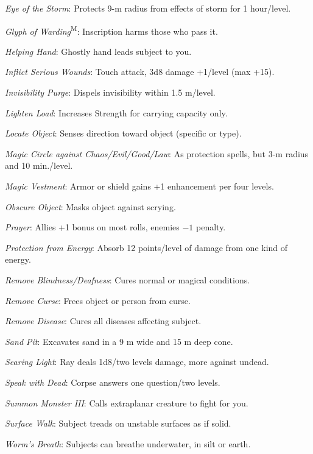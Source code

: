 \textit{Eye of the Storm}: Protects 9-m radius from effects of storm for 1 hour/level.

\textit{Glyph of Warding}\textsuperscript{M}: Inscription harms those who pass it.

\textit{Helping Hand}: Ghostly hand leads subject to you.

\textit{Inflict Serious Wounds}: Touch attack, 3d8 damage +1/level (max +15).

\textit{Invisibility Purge}: Dispels invisibility within 1.5 m/level.

\textit{Lighten Load}: Increases Strength for carrying capacity only.

\textit{Locate Object}: Senses direction toward object (specific or type).

\textit{Magic Circle against Chaos/Evil/Good/Law}: As protection spells, but 3-m radius and 10 min./level.

\textit{Magic Vestment}: Armor or shield gains +1 enhancement per four levels.


\textit{Obscure Object}: Masks object against scrying.

\textit{Prayer}: Allies +1 bonus on most rolls, enemies $-1$ penalty.

\textit{Protection from Energy}: Absorb 12 points/level of damage from one kind of energy.

\textit{Remove Blindness/Deafness}: Cures normal or magical conditions.

\textit{Remove Curse}: Frees object or person from curse.

\textit{Remove Disease}: Cures all diseases affecting subject.

\textit{Sand Pit}: Excavates sand in a 9 m wide and 15 m deep cone.

\textit{Searing Light}: Ray deals 1d8/two levels damage, more against undead.

\textit{Speak with Dead}: Corpse answers one question/two levels.


\textit{Summon Monster III}: Calls extraplanar creature to fight for you.

\textit{Surface Walk}: Subject treads on unstable surfaces as if solid.

\textit{Worm’s Breath}: Subjects can breathe underwater, in silt or earth.


